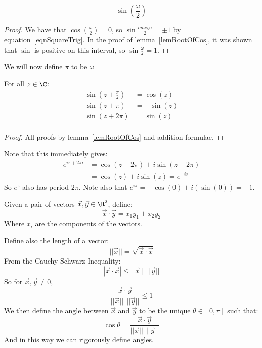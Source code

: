 \documentclass[../Main.tex]{subfiles}
\begin{document}
\begin{corollary}
    \begin{equation*}
        \sin\left(\frac{\omega}{2}\right)
    \end{equation*}
\end{corollary}
\begin{proof}
    We have that $\cos\left(\frac{\omega}{2}\right) = 0$, so $\sin\frac{omega}{2} = \pm 1$ by equation~\ref{eqnSquareTrig}. In the proof of lemma~\ref{lemRootOfCos}, it was shown that $\sin$ is positive on this interval, so $\sin\frac{\omega}{2} = 1$.
\end{proof}
We will now define $\pi$ to be $\omega$
\begin{theorem}
    For all $z \in \C$:
    \begin{align*}
        \sin\left(z + \frac{\pi}{2}\right) &= \cos(z) \\
        \sin\left(z + \pi\right) &= -\sin(z) \\
        \sin\left(z + 2\pi\right) &= \sin(z) \\
    \end{align*}
    \label{thmTrigPeriodicity}
\end{theorem}
\begin{proof}
    All proofs by lemma~\ref{lemRootOfCos} and addition formulae.
\end{proof}
Note that this immediately gives:
\begin{align*}
    e^{iz + 2\pi i} &= \cos(z + 2\pi) + i\sin(z + 2\pi) \\
    &= \cos(z) + i\sin(z) = e^{-iz}
\end{align*}
So $e^z$ also has period $2\pi$. Note also that $e^{i\pi} = -\cos(0) + i(\sin(0)) = -1$.\par
\begin{remark}
    Given a pair of vectors $\vec{x}, \vec{y} \in \R^2$, define:
    \begin{equation*}
        \vec{x} \cdot \vec{y} = x_1 y_1 + x_2 y_2
    \end{equation*}
    Where $x_i$ are the components of the vectors.\par
    Define also the length of a vector:
    \begin{equation*} 
        ||\vec{x}|| = \sqrt{\vec{x} \cdot \vec{x}}
    \end{equation*}
    From the Cauchy-Schwarz Inequality:
    \begin{equation*}
        |\vec{x} \cdot \vec{x}| \leq ||\vec{x}||~~||\vec{y}||
    \end{equation*}
    So for $\vec{x}, \vec{y} \neq 0$,
    \begin{equation*}
        \frac{\vec{x} \cdot \vec{y}}{||\vec{x}||~~||\vec{y}||} \leq 1
    \end{equation*}
    We then define the angle between $\vec{x}$ and $\vec{y}$ to be the unique $\theta \in [0, \pi]$ such that:
    \begin{equation*}
        \cos{\theta} = \frac{\vec{x} \cdot \vec{y}}{||\vec{x}||~~||\vec{y}||}
    \end{equation*}
    And in this way we can rigorously define angles.
\end{remark}
\end{document}
